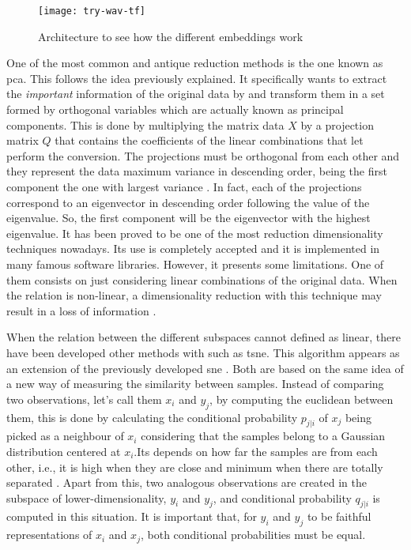 	\begin{wrapfigure}{R}{0.4\textwidth}
		\centering
		\captionsetup{justification=centering}
		\texttt{[image: try-wav-tf]}
		\caption{Architecture to see how the different embeddings work}
		\label{fig:mesh5}
	\end{wrapfigure}
	
	One of the most common and antique reduction methods is the one known as \acrfull{pca}. This follows the idea previously explained. It specifically wants to extract the \textit{important} information of the original data by and transform them in a set formed by orthogonal variables which are actually known as principal components. This is done by multiplying the matrix data $X$ by a projection matrix $Q$ that contains the coefficients of the linear combinations that let perform the conversion. The projections must be orthogonal from each other and they represent the data maximum variance in descending order, being the first component the one with largest variance \cite{Abdi2010}. In fact, each of the projections correspond to an eigenvector in descending order following the value of the eigenvalue. So, the first component will be the eigenvector with the highest eigenvalue. It has been proved to be one of the most reduction dimensionality techniques nowadays. Its use is completely accepted and it is implemented in many famous software libraries. However, it presents some limitations. One of them consists on just considering linear combinations of the original data. When the relation is non-linear, a dimensionality reduction with this technique may result in a loss of information \cite{AmatRodrigo2017}. 
	
	When the relation between the different subspaces cannot defined as linear, there have been developed other methods with such as \acrfull{tsne}. This algorithm appears as an extension of the previously developed \acrfull{sne} \cite{Hinton2003}. Both are based on the same idea of a new way of measuring the similarity between samples. Instead of comparing two observations, let's call them $x_i$ and $y_j$, by computing the euclidean between them, this is done by calculating the conditional probability $p_{j|i}$ of $x_j$ being picked as a neighbour of $x_i$ considering that the samples belong to a Gaussian distribution centered at $x_i$.Its depends on how far the samples are from each other, i.e., it is high when they are close and minimum when there are totally separated \cite{VanDerMaaten2008}. Apart from this, two analogous observations are created in the subspace of lower-dimensionality, $y_i$ and $y_j$, and conditional probability $q_{j|i}$ is computed in this situation. It is important that, for $y_i$ and $y_j$ to be faithful representations of $x_i$ and $x_j$, both conditional probabilities must be equal.
	
